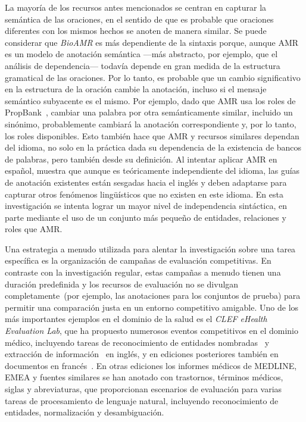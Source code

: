La mayoría de los recursos antes mencionados se centran en capturar la semántica de las oraciones, en el sentido de que es probable que oraciones diferentes con los mismos hechos se anoten de manera similar. Se puede considerar que \textit{BioAMR} es más dependiente de la sintaxis porque, aunque AMR es un modelo de anotación semántica ---más abstracto, por ejemplo, que el análisis de dependencia--- todavía depende en gran medida de la estructura gramatical de las oraciones. Por lo tanto, es probable que un cambio significativo en la estructura de la oración cambie la anotación, incluso si el mensaje semántico subyacente es el mismo. Por ejemplo, dado que AMR usa los roles de PropBank~\cite{propbank}, cambiar una palabra por otra semánticamente similar, incluido un sinónimo, probablemente cambiará la anotación correspondiente y, por lo tanto, los roles disponibles.
Esto también hace que AMR y recursos similares dependan del idioma, no solo en la práctica dada su dependencia de la existencia de bancos de palabras, pero también desde su definición. Al intentar aplicar AMR en español, \citet{migueles2018annotating} muestra que aunque es teóricamente independiente del idioma, las guías de anotación existentes están sesgadas hacia el inglés y deben adaptarse para capturar otros fenómenos lingüísticos que no existen en este idioma.
En esta investigación se intenta lograr un mayor nivel de independencia sintáctica, en parte mediante el uso de un conjunto más pequeño de entidades, relaciones y roles que AMR.

Una estrategia a menudo utilizada para alentar la investigación sobre una tarea específica es la organización de campañas de evaluación competitivas. En contraste con la investigación regular, estas campañas a menudo tienen una duración predefinida y los recursos de evaluación no se divulgan completamente~(por ejemplo, las anotaciones para los conjuntos de prueba) para permitir una comparación justa en un entorno competitivo amigable. Uno de los más importantes ejemplos en el dominio de la salud es el \textit{CLEF eHealth Evaluation Lab}, que ha propuesto numerosos eventos competitivos en el dominio médico, incluyendo tareas de reconocimiento de entidades nombradas~\cite{clef2013} y extracción de información~\cite{clef2014} en inglés, y en ediciones posteriores también en documentos en francés~\cite{clef2015, clef2016}.
En otras ediciones los informes médicos de MEDLINE, EMEA y fuentes similares se han anotado con trastornos, términos médicos, siglas y abreviaturas, que proporcionan escenarios de evaluación para varias tareas de procesamiento de lenguaje natural, incluyendo reconocimiento de entidades, normalización y desambiguación.

